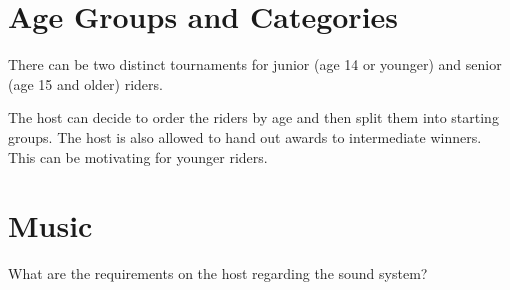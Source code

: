\section{Age Groups and Categories}

There can be two distinct tournaments for junior (age 14 or younger) and senior (age 15 and older) riders.

The host can decide to order the riders by age and then split them into starting groups.
The host is also allowed to hand out awards to intermediate winners.
This can be motivating for younger riders.

\section{Music}

\begin{framed}
What are the requirements on the host regarding the sound system?
\end{framed}

